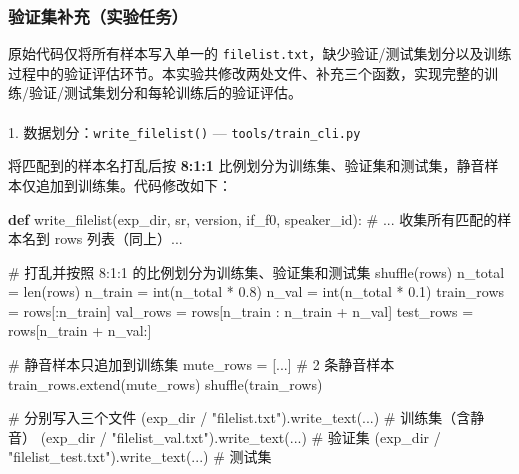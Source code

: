 \documentclass[
  english,
  letterpaper,
  DIV=11,
  numbers=noendperiod]{scrartcl}
\makeatletter
\let\oldparagraph\paragraph
\renewcommand{\paragraph}{
    \@ifstar
      \xxxParagraphStar
      \xxxParagraphNoStar
  }
\newcommand{\xxxParagraphStar}[1]{\oldparagraph*{#1}\mbox{}}
\newcommand{\xxxParagraphNoStar}[1]{\oldparagraph{#1}\mbox{}}
\newenvironment{Shaded}{\begin{snugshade}}{\end{snugshade}}
\newcommand{\BuiltInTok}[1]{\textcolor[rgb]{0.00,0.23,0.31}{#1}}
\newcommand{\CommentTok}[1]{\textcolor[rgb]{0.37,0.37,0.37}{#1}}
\newcommand{\FloatTok}[1]{\textcolor[rgb]{0.68,0.00,0.00}{#1}}
\newcommand{\KeywordTok}[1]{\textcolor[rgb]{0.00,0.23,0.31}{\textbf{#1}}}
\newcommand{\NormalTok}[1]{\textcolor[rgb]{0.00,0.23,0.31}{#1}}
\newcommand{\OperatorTok}[1]{\textcolor[rgb]{0.37,0.37,0.37}{#1}}
\newcommand{\StringTok}[1]{\textcolor[rgb]{0.13,0.47,0.30}{#1}}
\makeatother
\begin{document}
\subsubsection{验证集补充（实验任务）}\label{ux9a8cux8bc1ux96c6ux8865ux5145ux5b9eux9a8cux4efbux52a1}

原始代码仅将所有样本写入单一的
\texttt{filelist.txt}，缺少验证/测试集划分以及训练过程中的验证评估环节。本实验共修改两处文件、补充三个函数，实现完整的训练/验证/测试集划分和每轮训练后的验证评估。

\paragraph{\texorpdfstring{1. 数据划分：\texttt{write\_filelist()} ---
\texttt{tools/train\_cli.py}}{1. 数据划分：write\_filelist() --- tools/train\_cli.py}}\label{ux6570ux636eux5212ux5206write_filelist-toolstrain_cli.py}

将匹配到的样本名打乱后按 \textbf{8:1:1}
比例划分为训练集、验证集和测试集，静音样本仅追加到训练集。代码修改如下：

\begin{Shaded}
\begin{Highlighting}[]
\KeywordTok{def}\NormalTok{ write\_filelist(exp\_dir, sr, version, if\_f0, speaker\_id):}
    \CommentTok{\# ... 收集所有匹配的样本名到 rows 列表（同上）...}

    \CommentTok{\# 打乱并按照 8:1:1 的比例划分为训练集、验证集和测试集}
\NormalTok{    shuffle(rows)}
\NormalTok{    n\_total }\OperatorTok{=} \BuiltInTok{len}\NormalTok{(rows)}
\NormalTok{    n\_train }\OperatorTok{=} \BuiltInTok{int}\NormalTok{(n\_total }\OperatorTok{*} \FloatTok{0.8}\NormalTok{)}
\NormalTok{    n\_val }\OperatorTok{=} \BuiltInTok{int}\NormalTok{(n\_total }\OperatorTok{*} \FloatTok{0.1}\NormalTok{)}
\NormalTok{    train\_rows }\OperatorTok{=}\NormalTok{ rows[:n\_train]}
\NormalTok{    val\_rows }\OperatorTok{=}\NormalTok{ rows[n\_train : n\_train }\OperatorTok{+}\NormalTok{ n\_val]}
\NormalTok{    test\_rows }\OperatorTok{=}\NormalTok{ rows[n\_train }\OperatorTok{+}\NormalTok{ n\_val:]}

    \CommentTok{\# 静音样本只追加到训练集}
\NormalTok{    mute\_rows }\OperatorTok{=}\NormalTok{ [...]  }\CommentTok{\# 2 条静音样本}
\NormalTok{    train\_rows.extend(mute\_rows)}
\NormalTok{    shuffle(train\_rows)}

    \CommentTok{\# 分别写入三个文件}
\NormalTok{    (exp\_dir }\OperatorTok{/} \StringTok{"filelist.txt"}\NormalTok{).write\_text(...)       }\CommentTok{\# 训练集（含静音）}
\NormalTok{    (exp\_dir }\OperatorTok{/} \StringTok{"filelist\_val.txt"}\NormalTok{).write\_text(...)   }\CommentTok{\# 验证集}
\NormalTok{    (exp\_dir }\OperatorTok{/} \StringTok{"filelist\_test.txt"}\NormalTok{).write\_text(...)  }\CommentTok{\# 测试集}
\end{Highlighting}
\end{Shaded}
\end{document}
